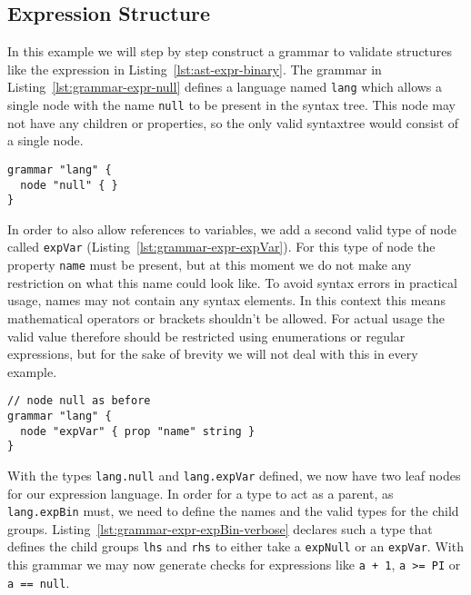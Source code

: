 \documentclass[sigconf,natbib=false]{acmart}
\newcommand\todo[1]{{\bfseries ToDo: #1}}
\begin{document}
\subsection{Expression Structure}

In this example we will step by step construct a grammar to validate structures like the expression in Listing~\ref{lst:ast-expr-binary}. The grammar in Listing~\ref{lst:grammar-expr-null} defines a language named \texttt{lang} which allows a single node with the name \texttt{null} to be present in the syntax tree. This node may not have any children or properties, so the only valid syntaxtree would consist of a single node.

\begin{lstlisting}[caption={Grammar for expression \texttt{null}}, label=lst:grammar-expr-null]
grammar "lang" {
  node "null" { }
}
\end{lstlisting}

In order to also allow references to variables, we add a second valid type of node called \texttt{expVar} (Listing~\ref{lst:grammar-expr-expVar}). For this type of node the property \texttt{name} must be present, but at this moment we do not make any restriction on what this name could look like. To avoid syntax errors in practical usage, names may not contain any syntax elements. In this context this means mathematical operators or brackets shouldn't be allowed. For actual usage the valid value therefore should be restricted using enumerations or regular expressions, but for the sake of brevity we will not deal with this in every example.

\begin{lstlisting}[float,floatplacement=H,caption={Grammar for expression \texttt{expVar}}, label=lst:grammar-expr-expVar]
// node null as before
grammar "lang" {
  node "expVar" { prop "name" string }
}
\end{lstlisting}

With the types \texttt{lang.null} and \texttt{lang.expVar} defined, we now have two leaf nodes for our expression language. In order for a type to act as a parent, as \texttt{lang.expBin} must, we need to define the names and the valid types for the child groups. Listing~\ref{lst:grammar-expr-expBin-verbose} declares such a type that defines the child groups \texttt{lhs} and \texttt{rhs} to either take a \texttt{expNull} or an \texttt{expVar}. With this grammar we may now generate checks for expressions like \texttt{a + 1}, \texttt{a >= PI} or \texttt{a == null}.
\end{document}
